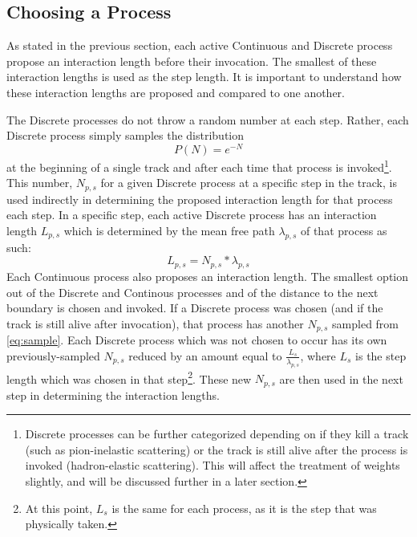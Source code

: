 \documentclass[12pt]{article}
\begin{document}
\subsection{Choosing a Process}
As stated in the previous section, each active Continuous and Discrete process propose an interaction length before their invocation. The smallest of these interaction lengths is used as the step length. %
It is important to understand how these interaction lengths are proposed and compared to one another.

The Discrete processes do not throw a random number at each step. Rather, each Discrete process simply samples the distribution 
\begin{equation}\label{eq:sample}
P(N) = e^{-N}
\end{equation}
at the beginning of a single track and after each time that process is invoked\footnote{Discrete processes can be further categorized depending on if they kill a track (such as pion-inelastic scattering) or the track is still alive after the process is invoked (hadron-elastic scattering). This will affect the treatment of weights slightly, and will be discussed further in a later section.\label{fn_Discrete}}. This number, $N_{p,s}$ for a given Discrete process at a specific step in the track, is used indirectly in determining the proposed interaction length for that process each step. In a specific step, each active Discrete process has an interaction length $L_{p,s}$ which is determined by the mean free path $\lambda_{p,s}$ of that process as such: 
\begin{equation}
L_{p,s} = N_{p,s} * \lambda_{p,s}
\end{equation}
Each Continuous process also proposes an interaction length. The smallest option out of the Discrete and Continous processes and of the distance to the next boundary is chosen and invoked. If a Discrete process was chosen (and if the track is still alive after invocation), that process has another $N_{p,s}$ sampled from \ref{eq:sample}. Each Discrete process which was not chosen to occur has its own previously-sampled $N_{p,s}$ reduced by an amount equal to $\frac{L_s}{\lambda_{p,s}}$, where $L_s$ is the step length which was chosen in that step\footnote{At this point, $L_s$ is the same for each process, as it is the step that was physically taken.}. These new $N_{p,s}$ are then used in the next step in determining the interaction lengths.
\end{document}

